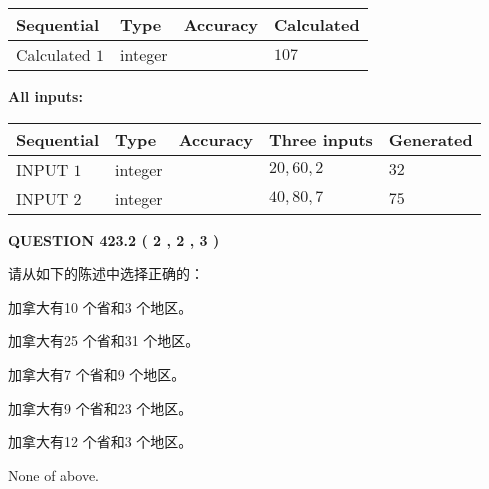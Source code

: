 \documentclass{ctexart}
\begin{document}
   
   
   
\noindent{}
   
   
  
  
\noindent\begin{tabular}{|l|l|l|l|}
\hline
 Sequential & Type & Accuracy & Calculated \\ 
\hline
 
 
  Calculated $  1 $ & integer &  & 
  $ 107 $ 
 \\  \hline  
 \end{tabular}
   
   
   
   
\noindent\vspace{0.1in}\hspace{-0.08in} {\textbf{\Large{All inputs: }}}
   
   
  
  
\noindent\begin{tabular}{|l|l|l|l|l|}
\hline
 Sequential & Type & Accuracy & Three inputs & Generated \\ 
\hline
 
 
  INPUT $  1 $ & integer &  & $
 20
 , 
 60
 , 
 2
 $ & $ 32 $ 
 \\  \hline  
 
 
  INPUT $  2 $ & integer &  & $
 40
 , 
 80
 , 
 7
 $ & $ 75 $ 
 \\  \hline  
 \end{tabular}
   
   
  
\vspace{0.2in}
  
{\textbf{\Large{QUESTION
423.2 
 ( 2 , 2 , 3 )
}}}
  
  
请从如下的陈述中选择正确的：
 
 
加拿大有10 个省和3 个地区。
 
 
加拿大有25 个省和31 个地区。
 
 
加拿大有7 个省和9 个地区。
 
 
加拿大有9 个省和23 个地区。
 
 
加拿大有12 个省和3 个地区。
 
 
 None of above.
 
 
\noindent{}
 
\end{document}
